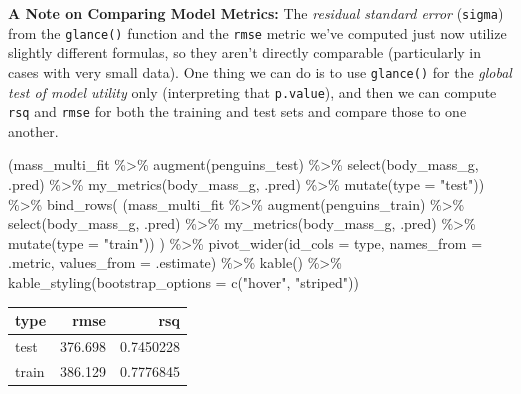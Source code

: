 \documentclass[
  letterpaper,
  DIV=11,
  numbers=noendperiod]{scrartcl}
\newenvironment{Shaded}{\begin{snugshade}}{\end{snugshade}}
\newcommand{\AttributeTok}[1]{\textcolor[rgb]{0.40,0.45,0.13}{#1}}
\newcommand{\FunctionTok}[1]{\textcolor[rgb]{0.28,0.35,0.67}{#1}}
\newcommand{\NormalTok}[1]{\textcolor[rgb]{0.00,0.23,0.31}{#1}}
\newcommand{\SpecialCharTok}[1]{\textcolor[rgb]{0.37,0.37,0.37}{#1}}
\newcommand{\StringTok}[1]{\textcolor[rgb]{0.13,0.47,0.30}{#1}}
\begin{document}
\textbf{A Note on Comparing Model Metrics:} The \emph{residual standard
error} (\texttt{sigma}) from the \texttt{glance()} function and the
\texttt{rmse} metric we've computed just now utilize slightly different
formulas, so they aren't directly comparable (particularly in cases with
very small data). One thing we can do is to use \texttt{glance()} for
the \emph{global test of model utility} only (interpreting that
\texttt{p.value}), and then we can compute \texttt{rsq} and
\texttt{rmse} for both the training and test sets and compare those to
one another.

\begin{Shaded}
\begin{Highlighting}[]
\NormalTok{(mass\_multi\_fit }\SpecialCharTok{\%\textgreater{}\%}
  \FunctionTok{augment}\NormalTok{(penguins\_test) }\SpecialCharTok{\%\textgreater{}\%}
  \FunctionTok{select}\NormalTok{(body\_mass\_g, .pred) }\SpecialCharTok{\%\textgreater{}\%}
  \FunctionTok{my\_metrics}\NormalTok{(body\_mass\_g, .pred) }\SpecialCharTok{\%\textgreater{}\%}
   \FunctionTok{mutate}\NormalTok{(}\AttributeTok{type =} \StringTok{"test"}\NormalTok{)) }\SpecialCharTok{\%\textgreater{}\%}
  \FunctionTok{bind\_rows}\NormalTok{(}
\NormalTok{    (mass\_multi\_fit }\SpecialCharTok{\%\textgreater{}\%}
       \FunctionTok{augment}\NormalTok{(penguins\_train) }\SpecialCharTok{\%\textgreater{}\%}
       \FunctionTok{select}\NormalTok{(body\_mass\_g, .pred) }\SpecialCharTok{\%\textgreater{}\%}
       \FunctionTok{my\_metrics}\NormalTok{(body\_mass\_g, .pred) }\SpecialCharTok{\%\textgreater{}\%}
       \FunctionTok{mutate}\NormalTok{(}\AttributeTok{type =} \StringTok{"train"}\NormalTok{))}
\NormalTok{  ) }\SpecialCharTok{\%\textgreater{}\%}
  \FunctionTok{pivot\_wider}\NormalTok{(}\AttributeTok{id\_cols =}\NormalTok{ type, }
              \AttributeTok{names\_from =}\NormalTok{ .metric, }
              \AttributeTok{values\_from =}\NormalTok{ .estimate) }\SpecialCharTok{\%\textgreater{}\%}
  \FunctionTok{kable}\NormalTok{() }\SpecialCharTok{\%\textgreater{}\%}
  \FunctionTok{kable\_styling}\NormalTok{(}\AttributeTok{bootstrap\_options =} \FunctionTok{c}\NormalTok{(}\StringTok{"hover"}\NormalTok{, }\StringTok{"striped"}\NormalTok{))}
\end{Highlighting}
\end{Shaded}

\begin{longtable}[t]{lrr}
\toprule
type & rmse & rsq\\
\midrule
test & 376.698 & 0.7450228\\
train & 386.129 & 0.7776845\\
\bottomrule
\end{longtable}
\end{document}
